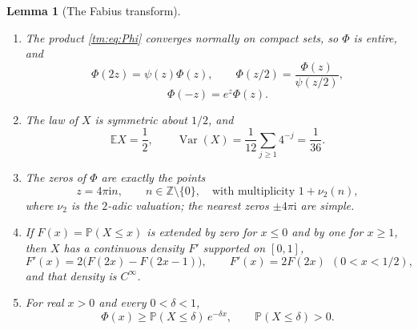 \documentclass[11pt,a4paper,oneside,openany]{book}
\numberwithin{equation}{chapter}
\newtheorem{lemma}[theorem]{Lemma}
\theoremstyle{definition}
\theoremstyle{remark}
\newcommand{\Z}{\mathbb Z}
\newcommand{\E}{\mathbb E}
\newcommand{\Prob}{\mathbb P}
\newcommand{\ii}{\mathrm i}
\newcommand{\vnu}{\nu_2}
\begin{document}
\begin{lemma}[The Fabius transform]\label{tm:lem:Phi}
\begin{enumerate}[label=(\roman*)]
\item The product \eqref{tm:eq:Phi} converges normally on compact sets, so
$\Phi$ is entire, and
\begin{equation}\label{tm:eq:Phi-dilation}
 \Phi(2z)=\psi(z)\Phi(z),\qquad
 \Phi(z/2)=\frac{\Phi(z)}{\psi(z/2)},
\end{equation}
\begin{equation}\label{tm:eq:Phi-reflection}
 \Phi(-z)=e^{z}\Phi(z).
\end{equation}
\item The law of $X$ is symmetric about $1/2$, and
\begin{equation}\label{tm:eq:X-moments}
 \E X=\frac12,\qquad\operatorname{Var}(X)=\frac1{12}\sum_{j\ge1}4^{-j}=\frac1{36}.
\end{equation}
\item The zeros of $\Phi$ are exactly the points
\begin{equation}\label{tm:eq:Phi-zeros}
 z=4\pi\ii n,\qquad n\in\Z\setminus\{0\},
 \quad\text{with multiplicity }1+\vnu(n),
\end{equation}
where $\vnu$ is the $2$-adic valuation; the nearest zeros $\pm4\pi\ii$ are
simple.
\item If $F(x)=\Prob(X\le x)$ is extended by zero for $x\le0$ and by one
for $x\ge1$, then $X$ has a continuous density $F'$ supported on $[0,1]$,
\begin{equation}\label{tm:eq:Fabius-cdf}
 F'(x)=2\bigl(F(2x)-F(2x-1)\bigr),\qquad F'(x)=2F(2x)\ \ (0<x<1/2),
\end{equation}
and that density is $C^\infty$.
\item For real $x>0$ and every $0<\delta<1$,
\begin{equation}\label{tm:eq:Phi-lower}
 \Phi(x)\ge\Prob(X\le\delta)\,e^{-\delta x},\qquad \Prob(X\le\delta)>0.
\end{equation}
\end{enumerate}
\end{lemma}
\end{document}
